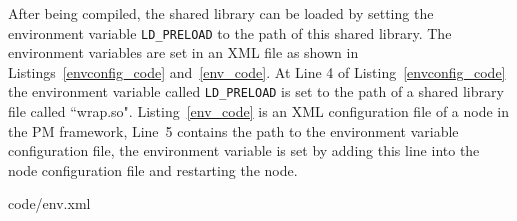 After being compiled, the shared library can be loaded by setting the environment variable \texttt{LD\_PRELOAD} to the path of this shared library. %
The environment variables are set in an XML file as shown in Listings~\ref{envconfig_code} and~\ref{env_code}. At Line 4 of Listing~\ref{envconfig_code} the environment variable called \texttt{LD\_PRELOAD} is set to the path of a shared library file called ``wrap.so". Listing~\ref{env_code} is an XML configuration file of a node in the PM framework, Line~5 contains the path to the environment variable configuration file, the environment variable is set by adding this line into the node configuration file and restarting the node.



\begin{minipage}{.96\columnwidth}

{code/env.xml}
\end{minipage}